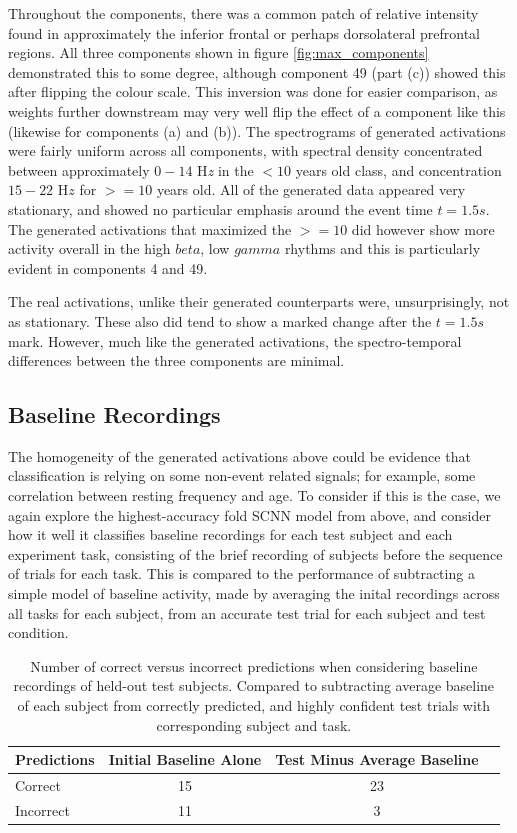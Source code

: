 \documentclass[fleqn,10pt]{wlscirep}
\begin{document}
Throughout the components, there was a common patch of relative intensity found in approximately the inferior frontal or perhaps dorsolateral prefrontal regions. All three components shown in figure \ref{fig:max_components} demonstrated this to some degree, although component 49 (part (c)) showed this after flipping the colour scale. This inversion was done for easier comparison, as weights further downstream may very well flip the effect of a component like this (likewise for components (a) and (b)). The spectrograms of generated activations were fairly uniform across all components, with spectral density concentrated between approximately $0-14$ H{\em z} in the $<10$ years old class, and concentration $15-22$ H$z$ for $>=10$ years old. All of the generated data appeared very stationary, and showed no particular emphasis around the event time $t=1.5s$. The generated activations that maximized the $>=10$ did however show more activity overall in the high $beta$, low $gamma$ rhythms and this is particularly evident in components 4 and 49.

The real activations, unlike their generated counterparts were, unsurprisingly, not as stationary. These also did tend to show a marked change after the $t=1.5s$ mark. However, much like the generated activations, the spectro-temporal differences between the three components are minimal.

\subsection*{Baseline Recordings}

The homogeneity of the generated activations above could be evidence that classification is relying on some non-event related signals; for example, some correlation between resting frequency and age. To consider if this is the case, we again explore the highest-accuracy fold SCNN model from above, and consider how it well it classifies baseline recordings for each test subject and each experiment task, consisting of the brief recording of subjects before the sequence of trials for each task. This is compared to the performance of subtracting a simple model of baseline activity, made by averaging the inital recordings across all tasks for each subject, from an accurate test trial for each subject and test condition.

\begin{table}[h]
 \caption{Number of correct versus incorrect predictions when considering baseline recordings of held-out test subjects. Compared to subtracting average baseline of each subject from correctly predicted, and highly confident test trials with corresponding subject and task.}
 \centering
 \begin{tabular}{l | c | c | c}
   \toprule
   \textbf{Predictions} &  \textbf{Initial Baseline Alone} & \textbf{Test Minus Average Baseline} \\
   \toprule
                        Correct           & 15 & 23  \\
                        Incorrect         & 11 &  3  \\ 
   \bottomrule
 \end{tabular}
 \label{tab:rest_performance3}
\end{table}
\end{document}
